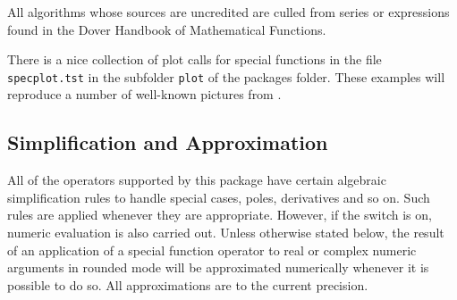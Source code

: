 All algorithms whose sources are uncredited are culled from series or
expressions found in the Dover Handbook of Mathematical
Functions\cite{Abramowitz:72}.

There is a nice collection of plot calls for special functions
in the file \texttt{specplot.tst} in the subfolder \texttt{plot} of the packages folder.
These examples will reproduce a number of well-known pictures from
\cite{Abramowitz:72}.

\subsection{Simplification and Approximation}

All of the operators supported by this package have certain algebraic
simplification rules to handle special cases, poles, derivatives and so
on.  Such rules are applied whenever they are appropriate.  However, if
the  switch is on, numeric evaluation is also carried out.
Unless otherwise stated below, the result of an application of a special
function operator to real or complex numeric arguments in rounded mode
will be approximated numerically whenever it is possible to do so.  All
approximations are to the current precision.

